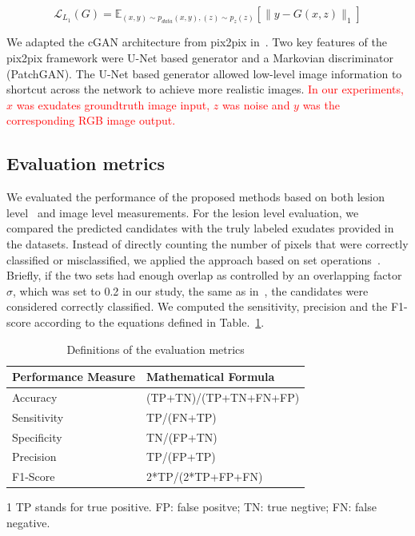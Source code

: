 \documentclass{osa-article}
\begin{document}
\begin{equation}
\mathcal{L}_{L_1}(G) = \mathbb{E}_{(x,y)\sim p_{data}(x,y),(z)\sim p_z(z)}[\|y -G(x,z)\|_1] 
\label{Eq:cGAN_obj}
\end{equation}

We adapted the cGAN architecture from pix2pix in~\cite{isola2016image}. Two key features of the pix2pix framework were U-Net \cite{ronneberger2015u} based generator and a Markovian discriminator (PatchGAN). The U-Net based generator allowed low-level image information to shortcut across the network to achieve more realistic images. \textcolor{red}{In our experiments, $x$ was exudates groundtruth image input, $z$ was noise and $y$ was the corresponding RGB image output. }


\subsection{Evaluation metrics}
We evaluated the performance of the proposed methods based on both lesion level~\cite{wolf2006object} and image level measurements. For the lesion level evaluation, we compared the predicted candidates with the truly labeled exudates provided in the datasets. Instead of directly counting the number of pixels that were correctly classified or misclassified, we applied the approach based on set operations~\cite{zhang2014exudate, wolf2006object}. Briefly, if the two sets had enough overlap as controlled by an overlapping factor $\sigma$, which was set to 0.2 in our study, the same as in~\cite{zhang2014exudate}, the candidates were considered correctly classified. We computed the sensitivity, precision and the F1-score according to the equations defined in Table.~\ref{table:evaluation_metric}.
\begin{table}[htbp]
\centering
\begin{threeparttable}
\centering
\caption{Definitions of the evaluation metrics}
\begin{tabular}{ll}
\hline
 Performance Measure & Mathematical Formula \\
\hline
Accuracy & (TP+TN)/(TP+TN+FN+FP) \\
Sensitivity & TP/(FN+TP) \\
Specificity& TN/(FP+TN)  \\
Precision & TP/(FP+TP)  \\
F1-Score & 2*TP/(2*TP+FP+FN)\\
\hline
\end{tabular}
\label{table:evaluation_metric}
\begin{tablenotes}
\item[1] TP stands for true positive. FP: false positve; TN:  true negtive; FN: false negative.
\end{tablenotes}
\end{threeparttable}
\end{table}
\end{document}
